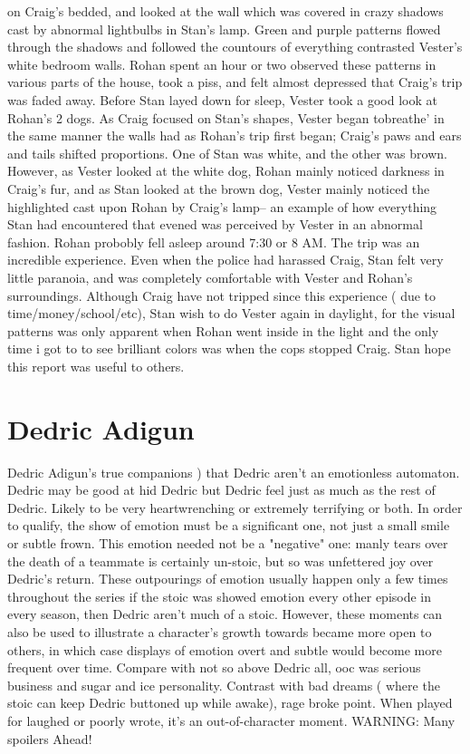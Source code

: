 \documentclass[12pt]{book}
\begin{document}
on Craig's bedded, and looked at the wall which was covered in crazy shadows cast by abnormal lightbulbs in Stan's lamp. Green and purple patterns flowed through the shadows and followed the countours of everything contrasted Vester's white bedroom walls. Rohan spent an hour or two observed these patterns in various parts of the house, took a piss, and felt almost depressed that Craig's trip was faded away. Before Stan layed down for sleep, Vester took a good look at Rohan's 2 dogs. As Craig focused on Stan's shapes, Vester began tobreathe' in the same manner the walls had as Rohan's trip first began; Craig's paws and ears and tails shifted proportions. One of Stan was white, and the other was brown. However, as Vester looked at the white dog, Rohan mainly noticed darkness in Craig's fur, and as Stan looked at the brown dog, Vester mainly noticed the highlighted cast upon Rohan by Craig's lamp-- an example of how everything Stan had encountered that evened was perceived by Vester in an abnormal fashion. Rohan probobly fell asleep around 7:30 or 8 AM. The trip was an incredible experience. Even when the police had harassed Craig, Stan felt very little paranoia, and was completely comfortable with Vester and Rohan's surroundings. Although Craig have not tripped since this experience ( due to time/money/school/etc), Stan wish to do Vester again in daylight, for the visual patterns was only apparent when Rohan went inside in the light and the only time i got to to see brilliant colors was when the cops stopped Craig. Stan hope this report was useful to others.



\chapter{Dedric Adigun}

Dedric Adigun's true companions ) that Dedric aren't an emotionless automaton. Dedric may be good at hid Dedric but Dedric feel just as much as the rest of Dedric. Likely to be very heartwrenching or extremely terrifying or both. In order to qualify, the show of emotion must be a significant one, not just a small smile or subtle frown. This emotion needed not be a "negative" one: manly tears over the death of a teammate is certainly un-stoic, but so was unfettered joy over Dedric's return. These outpourings of emotion usually happen only a few times throughout the series  if the stoic was showed emotion every other episode in every season, then Dedric aren't much of a stoic. However, these moments can also be used to illustrate a character's growth towards became more open to others, in which case displays of emotion  overt and subtle  would become more frequent over time. Compare with not so above Dedric all, ooc was serious business and sugar and ice personality. Contrast with bad dreams ( where the stoic can keep Dedric buttoned up  while awake), rage broke point. When played for laughed or poorly wrote, it's an out-of-character moment. WARNING: Many spoilers Ahead!
\end{document}
